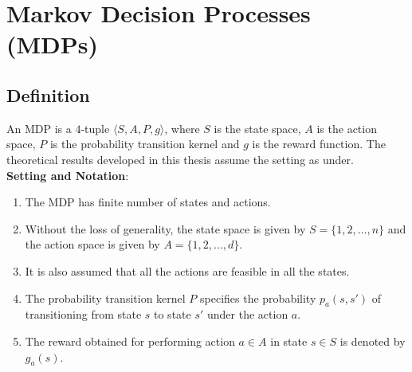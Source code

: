 \chapter{Markov Decision Processes (MDPs)}
\section{Definition}
An MDP is a $4$-tuple $\langle S,A,P,g\rangle$, where $S$ is the state space, $A$ is the action space, $P$ is the probability transition kernel and $g$ is the reward function.
The theoretical results developed in this thesis assume the setting as under.\\
\textbf{Setting and Notation}:\\
\begin{enumerate}
\item The MDP has finite number of states and actions.
\item Without the loss of generality, the state space is given by $S=\{1,2,\ldots,n\}$ and the action space is given by $A=\{1,2,\ldots,d\}$.
\item It is also assumed that all the actions are feasible in all the states.
\item The probability transition kernel $P$ specifies the probability $p_a(s,s')$ of transitioning from state $s$ to state $s'$ under the action $a$. 
\item The reward obtained for performing action $a\in A$ in state $s\in S$ is denoted by $g_a(s)$.
\end{enumerate}
